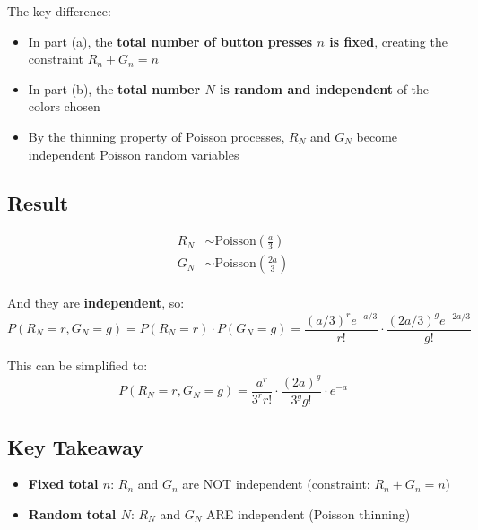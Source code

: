 \documentclass[12pt]{article}
\begin{document}
The key difference:
\begin{itemize}[leftmargin=*]
    \item In part (a), the \textbf{total number of button presses $n$ is fixed}, creating the constraint $R_n + G_n = n$
    \item In part (b), the \textbf{total number $N$ is random and independent} of the colors chosen
    \item By the thinning property of Poisson processes, $R_N$ and $G_N$ become independent Poisson random variables
\end{itemize}

\subsection*{Result}

\begin{align*}
R_N &\sim \text{Poisson}\left(\frac{a}{3}\right)\\[5pt]
G_N &\sim \text{Poisson}\left(\frac{2a}{3}\right)\\[5pt]
\end{align*}

And they are \textbf{independent}, so:
\begin{equation*}
\boxed{P(R_N = r, G_N = g) = P(R_N = r) \cdot P(G_N = g) = \frac{(a/3)^r e^{-a/3}}{r!} \cdot \frac{(2a/3)^g e^{-2a/3}}{g!}}
\end{equation*}

This can be simplified to:
\begin{equation*}
P(R_N = r, G_N = g) = \frac{a^r}{3^r r!} \cdot \frac{(2a)^g}{3^g g!} \cdot e^{-a}
\end{equation*}

\subsection*{Key Takeaway}

\begin{itemize}[leftmargin=*]
    \item \textbf{Fixed total $n$}: $R_n$ and $G_n$ are NOT independent (constraint: $R_n + G_n = n$)
    \item \textbf{Random total $N$}: $R_N$ and $G_N$ ARE independent (Poisson thinning)
\end{itemize}
\end{document}
